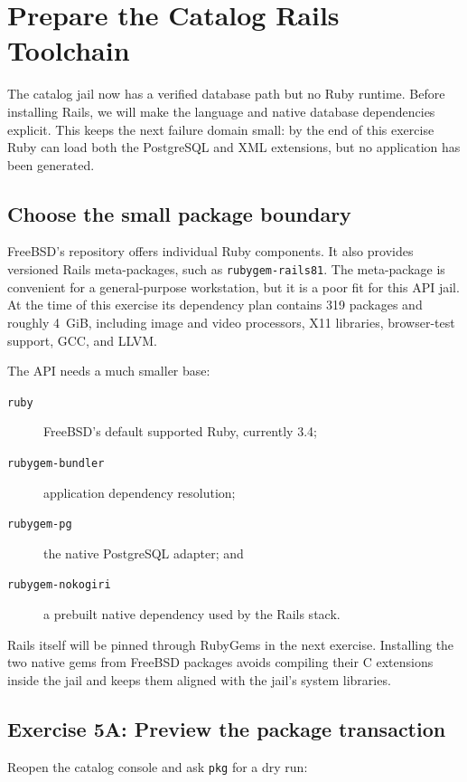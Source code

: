 \chapter{Prepare the Catalog Rails Toolchain}

The catalog jail now has a verified database path but no Ruby runtime. Before
installing Rails, we will make the language and native database dependencies
explicit. This keeps the next failure domain small: by the end of this exercise
Ruby can load both the PostgreSQL and XML extensions, but no application has
been generated.

\section{Choose the small package boundary}

FreeBSD's repository offers individual Ruby components. It also provides
versioned Rails meta-packages, such as \texttt{rubygem-rails81}. The
meta-package is convenient for a general-purpose workstation, but it is a poor
fit for this API jail. At the time of this exercise its dependency plan
contains 319 packages and roughly 4~GiB, including image and video processors,
X11 libraries, browser-test support, GCC, and LLVM.

The API needs a much smaller base:

\begin{description}
  \item[\texttt{ruby}] FreeBSD's default supported Ruby, currently 3.4;
  \item[\texttt{rubygem-bundler}] application dependency resolution;
  \item[\texttt{rubygem-pg}] the native PostgreSQL adapter; and
  \item[\texttt{rubygem-nokogiri}] a prebuilt native dependency used by the
    Rails stack.
\end{description}

Rails itself will be pinned through RubyGems in the next exercise. Installing
the two native gems from FreeBSD packages avoids compiling their C extensions
inside the jail and keeps them aligned with the jail's system libraries.

\section{Exercise 5A: Preview the package transaction}

Reopen the catalog console and ask \texttt{pkg} for a dry run:

